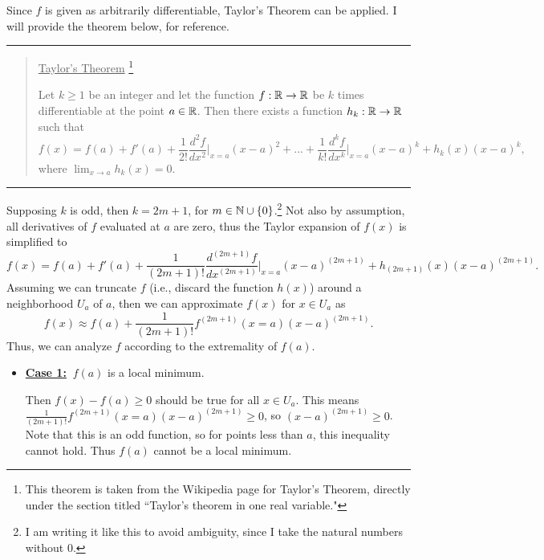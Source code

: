 \begin{solution}

    Since $f$ is given as arbitrarily differentiable, Taylor's Theorem can be applied. I will provide the theorem below, for reference.
    
    \begin{center}\rule{17cm}{0.1mm}\end{center}
    \begin{quote}
        \vspace{-5mm}
        \underline{Taylor's Theorem} \footnote{This theorem is taken from the Wikipedia page for Taylor's Theorem, directly under the section titled ``Taylor's theorem in one real variable."}
        
        Let $k \geq 1$ be an integer and let the function $f :\mathbb{R} \rightarrow \mathbb{R}$ be $k$ times differentiable at the point $a \in \mathbb{R}$. Then there exists a function $h_k : \mathbb{R} \rightarrow \mathbb{R}$ such that 
        \[f(x) = f(a) + f'(a) + \frac{1}{2!}\frac{d^2f}{dx^2}\bigg|_{x = a}(x - a)^2 + ... + \frac{1}{k!}\frac{d^kf}{dx^k}\bigg|_{x = a}(x - a)^k + h_k(x)(x - a)^k,\]
        where $\lim_{x \rightarrow a} h_k(x) = 0.$
    \vspace{-5mm}
    \end{quote}
    \begin{center}\rule{17cm}{0.1mm}\end{center}
    Supposing $k$ is odd, then $k = 2m+1$, for $m \in \mathbb{N} \cup \{ 0 \}$.\footnote{I am writing it like this to avoid ambiguity, since I take the natural numbers without 0.} Not also by assumption, all derivatives of $f$ evaluated at $a$ are zero, thus the Taylor expansion of $f(x)$ is simplified to
    \[
    f(x) = f(a) + f'(a) + \frac{1}{(2m+1)!}\frac{d^{(2m+1)}f}{dx^{(2m+1)}}\bigg|_{x = a}(x - a)^{(2m+1)} + h_{(2m+1)}(x)(x - a)^{(2m+1)}.
    \]
    Assuming we can truncate $f$ (i.e., discard the function $h(x)$) around a neighborhood $U_a$ of $a$, then we can approximate $f(x)$ for $x \in U_a$ as 
    \[
    f(x) \approx f(a) + \frac{1}{(2m+1)!}f^{(2m+1)}(x = a) (x - a)^{(2m+1)}.
    \]
    Thus, we can analyze $f$ according to the extremality of $f(a)$.
    \newpage
    \begin{itemize}[-]
        \item \underline{\textbf{Case 1:}} $ \ f(a)$ is a local minimum.
        
        \hop
        Then $f(x) - f(a) \geq 0$ should be true for all $x \in U_a$. This means $\frac{1}{(2m+1)!}f^{(2m+1)}(x = a) (x - a)^{(2m+1)} \geq 0$, so $(x - a)^{(2m+1)} \geq 0$. Note that this is an odd function, so for points less than $a$, this inequality cannot hold. Thus $f(a)$ cannot be a local minimum.
        

\end{itemize}
\end{solution}
